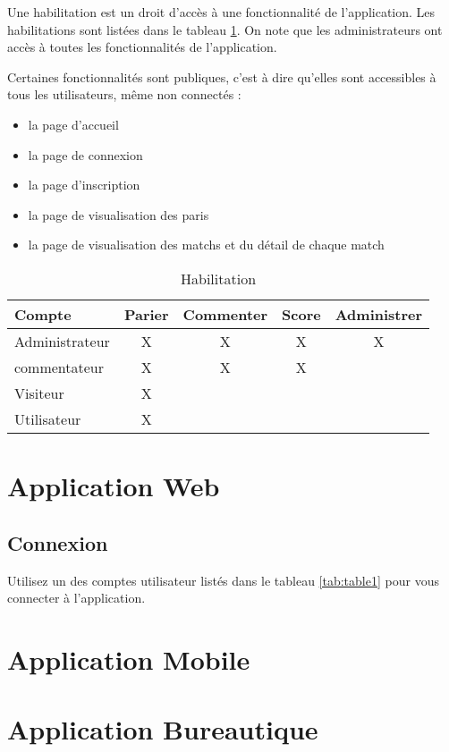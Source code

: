\documentclass{book}
\begin{document}
Une habilitation est un droit d'accès à une fonctionnalité de l'application. Les habilitations sont listées 
dans le tableau \ref{tab:table2}. On note que les administrateurs ont accès à toutes les fonctionnalités de
l'application. 

Certaines fonctionnalités sont publiques, c'est à dire qu'elles sont accessibles à tous les utilisateurs, même non connectés :
\begin{itemize}
  \item la page d'accueil
  \item la page de connexion
  \item la page d'inscription
  \item la page de visualisation des paris
  \item la page de visualisation des matchs et du détail de chaque match
\end{itemize}

\begin{table}[H]
  \label{tab:table2}
    \begin{tabular}{l|c|c|c|c} \toprule
      \textbf{Compte} & \textbf{Parier} & \textbf{Commenter} & \textbf{Score} & \textbf{Administrer} \\ \hline
      Administrateur & X & X & X & X  \\ \hline
      commentateur & X & X & X &  \\ \hline
      Visiteur & X & & & \\ \hline
      Utilisateur & X & & & \\ \hline
    \end{tabular}
    \caption{Habilitation}
\end{table}


\chapter{Application Web}

\section{Connexion}

Utilisez un des comptes utilisateur listés dans le tableau \ref{tab:table1} pour vous connecter à l'application.

\chapter{Application Mobile}


\chapter{Application Bureautique}


\begin{appendix}
    \listoffigures
    \listoftables
  \end{appendix}
\end{document}
